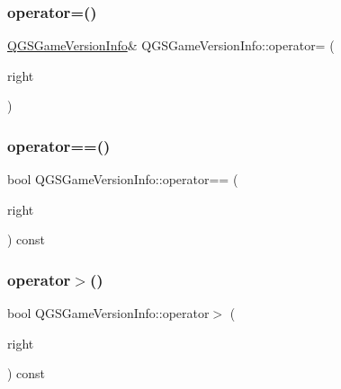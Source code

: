 \mbox{\label{class_q_g_s_game_version_info_a19df4036b3bc906166d453512df5b21b}} 
\subsubsection{\texorpdfstring{operator=()}{operator=()}\hspace{0.1cm}{\footnotesize\ttfamily [2/2]}}
{\footnotesize\ttfamily \mbox{\hyperlink{class_q_g_s_game_version_info}{Q\+G\+S\+Game\+Version\+Info}}\& Q\+G\+S\+Game\+Version\+Info\+::operator= (\begin{DoxyParamCaption}\item[{\mbox{\hyperlink{class_q_g_s_game_version_info}{Q\+G\+S\+Game\+Version\+Info}} \&\&}]{right }\end{DoxyParamCaption})\hspace{0.3cm}{\ttfamily [default]}}

\mbox{\label{class_q_g_s_game_version_info_a502f8be8831d769a149a169408b16817}} 
\subsubsection{\texorpdfstring{operator==()}{operator==()}}
{\footnotesize\ttfamily bool Q\+G\+S\+Game\+Version\+Info\+::operator== (\begin{DoxyParamCaption}\item[{const \mbox{\hyperlink{class_q_g_s_game_version_info}{Q\+G\+S\+Game\+Version\+Info}} \&}]{right }\end{DoxyParamCaption}) const}

\mbox{\label{class_q_g_s_game_version_info_a5dc635086c504bc5d802a4eb16f8c0ab}} 
\subsubsection{\texorpdfstring{operator$>$()}{operator>()}}
{\footnotesize\ttfamily bool Q\+G\+S\+Game\+Version\+Info\+::operator$>$ (\begin{DoxyParamCaption}\item[{const \mbox{\hyperlink{class_q_g_s_game_version_info}{Q\+G\+S\+Game\+Version\+Info}} \&}]{right }\end{DoxyParamCaption}) const}

